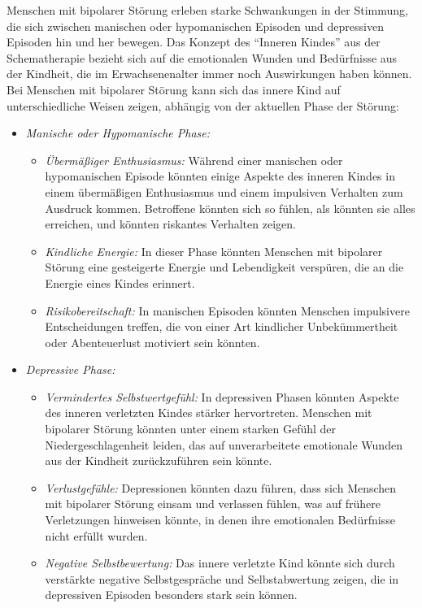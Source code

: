 Menschen mit bipolarer Störung erleben starke Schwankungen in der Stimmung, die sich zwischen manischen oder hypomanischen Episoden und depressiven Episoden hin und her bewegen. Das Konzept des \enquote{Inneren Kindes} aus der Schematherapie bezieht sich auf die emotionalen Wunden und Bedürfnisse aus der Kindheit, die im Erwachsenenalter immer noch Auswirkungen haben können. Bei Menschen mit bipolarer Störung kann sich das innere Kind auf unterschiedliche Weisen zeigen, abhängig von der aktuellen Phase der Störung:
\begin{itemize}
    \item \emph{Manische oder Hypomanische Phase:}
        \begin{itemize}
            \item \emph{Übermäßiger Enthusiasmus:} Während einer manischen oder hypomanischen Episode könnten einige Aspekte des inneren Kindes in einem übermäßigen Enthusiasmus und einem impulsiven Verhalten zum Ausdruck kommen. Betroffene könnten sich so fühlen, als könnten sie alles erreichen, und könnten riskantes Verhalten zeigen.
            \item \emph{Kindliche Energie:} In dieser Phase könnten Menschen mit bipolarer Störung eine gesteigerte Energie und Lebendigkeit verspüren, die an die Energie eines Kindes erinnert.
            \item \emph{Risikobereitschaft:} In manischen Episoden könnten Menschen impulsivere Entscheidungen treffen, die von einer Art kindlicher Unbekümmertheit oder Abenteuerlust motiviert sein könnten.
        \end{itemize}

    \item \emph{Depressive Phase:}
        \begin{itemize}
            \item \emph{Vermindertes Selbstwertgefühl:} In depressiven Phasen könnten Aspekte des inneren verletzten Kindes stärker hervortreten. Menschen mit bipolarer Störung könnten unter einem starken Gefühl der Niedergeschlagenheit leiden, das auf unverarbeitete emotionale Wunden aus der Kindheit zurückzuführen sein könnte.
            \item \emph{Verlustgefühle:} Depressionen könnten dazu führen, dass sich Menschen mit bipolarer Störung einsam und verlassen fühlen, was auf frühere Verletzungen hinweisen könnte, in denen ihre emotionalen Bedürfnisse nicht erfüllt wurden.
            \item \emph{Negative Selbstbewertung:} Das innere verletzte Kind könnte sich durch verstärkte negative Selbstgespräche und Selbstabwertung zeigen, die in depressiven Episoden besonders stark sein können.
        \end{itemize}
\end{itemize}
